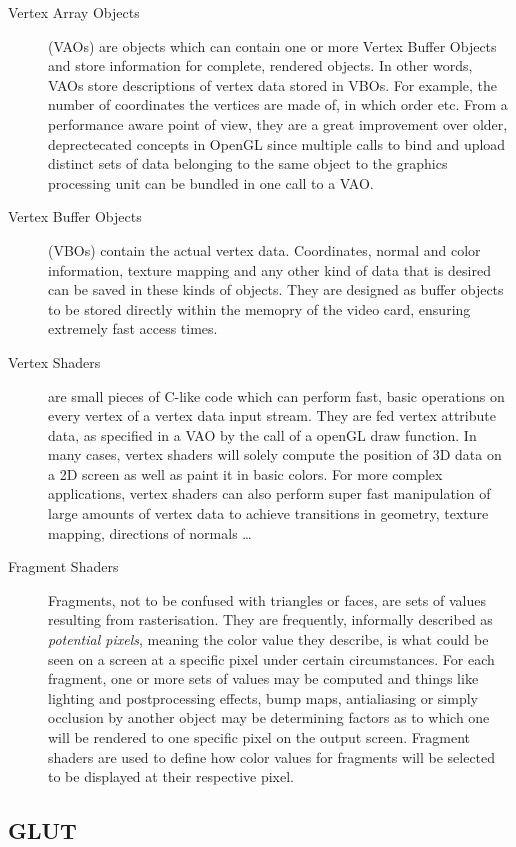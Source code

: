 \begin{description}
	\item[Vertex Array Objects] (VAOs) are objects which can contain one or more Vertex Buffer Objects and store information for complete, rendered objects. In other words, VAOs store descriptions of vertex data stored in VBOs. For example, the number of coordinates the vertices are made of, in which order etc. From a performance aware point of view, they are a great improvement over older, deprectecated concepts in OpenGL since multiple calls to bind and upload distinct sets of data belonging to the same object to the graphics processing unit can be bundled in one call to a VAO.
	\item[Vertex Buffer Objects] (VBOs) contain the actual vertex data. Coordinates, normal and color information, texture mapping and any other kind of data that is desired can be saved in these kinds of objects. They are designed as buffer objects to be stored directly within the memopry of the video card, ensuring extremely fast access times.
	\item[Vertex Shaders] are small pieces of C-like code which can perform fast, basic operations on every vertex of a vertex data input stream. They are fed vertex attribute data, as specified in a VAO by the call of a openGL draw function. In many cases, vertex shaders will solely compute the position of 3D data on a 2D screen as well as paint it in basic colors. For more complex applications, vertex shaders can also perform super fast manipulation of large amounts of vertex data to achieve transitions in geometry, texture mapping, directions of normals \dots
	\item[Fragment Shaders] Fragments, not to be confused with triangles or faces, are sets of values resulting from rasterisation. They are frequently, informally described as \textit{potential pixels}, meaning the color value they describe, is what could be seen on a screen at a specific pixel under certain circumstances. For each fragment, one or more sets of values may be computed and things like lighting and postprocessing effects, bump maps, antialiasing or simply occlusion by another object may be determining factors as to which one will be rendered to one specific pixel on the output screen. Fragment shaders are used to define how color values for fragments will be selected to be displayed at their respective pixel.
\end{description}

\subsection{GLUT}
\label{sec:glut}

